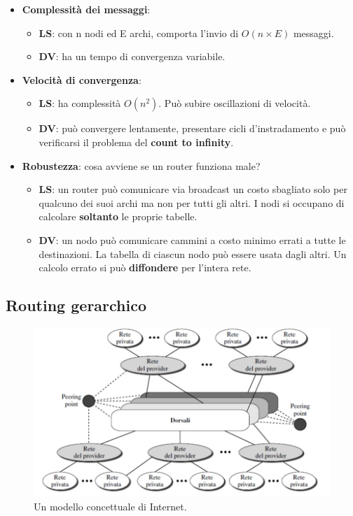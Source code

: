 \documentclass[11pt,a4paper,oneside]{book}
\theoremstyle{definition}
\begin{document}
\begin{itemize}
	\item \textbf{Complessità dei messaggi}:
	      \begin{itemize}
		      \item \textbf{LS}: con n nodi ed E
		            archi, comporta l’invio di
		            $O(n \times E)$ messaggi.
		      \item \textbf{DV}: ha un tempo di convergenza variabile.
	      \end{itemize}
	\item \textbf{Velocità di convergenza}:
	      \begin{itemize}
		      \item \textbf{LS}: ha complessità $O(n^2)$. Può subire oscillazioni di velocità.
		      \item \textbf{DV}: può convergere lentamente, presentare cicli d’instradamento e può
		            verificarsi il problema del \textbf{count to infinity}.
	      \end{itemize}
	\item \textbf{Robustezza}: cosa avviene se
	      un router funziona male?
	      \begin{itemize}
		      \item \textbf{LS}: un router può comunicare via
		            broadcast un costo sbagliato solo
		            per qualcuno dei suoi archi
		            ma non per tutti gli altri. I nodi si occupano di calcolare
		            \textbf{soltanto} le proprie tabelle.
		      \item \textbf{DV}:  un nodo può comunicare
		            cammini a costo minimo
		            errati a tutte le destinazioni. La tabella di ciascun nodo può
		            essere usata dagli altri. Un calcolo errato si può
		            \textbf{diffondere} per l’intera rete.
	      \end{itemize}
\end{itemize}

\pagebreak

\subsection{Routing gerarchico}
\begin{figure}[!h]
	\includegraphics[scale=0.85]{Immagini/Internet_Concept.png}
	\centering
	\caption{Un modello concettuale di Internet.}
\end{figure}
\end{document}
